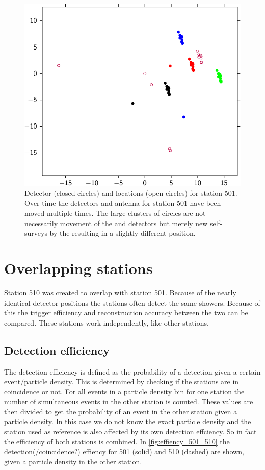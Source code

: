 \begin{figure}
    \centering
    \includegraphics{plots/station/locations_501}
    \caption{Detector (closed circles) and \gps locations (open circles) for station 501. Over time the detectors and \gps antenna for station 501 have been moved multiple times. The large clusters of circles are not necessarily movement of the \gps and detectors but merely new self-surveys by the \gps resulting in a slightly different position.}
    \label{fig:locations_501}
\end{figure}


\section{Overlapping stations}

Station 510 was created to overlap with station 501. Because of the nearly identical detector positions the stations often detect the same showers. Because of this the trigger efficiency and reconstruction accuracy between the two can be compared. These stations work independently, like other stations.


\subsection{Detection efficiency}

The detection efficiency is defined as the probability of a detection given a certain event/particle density. This is determined by checking if the stations are in coincidence or not. For all events in a particle density bin for one station the number of simultaneous events in the other station is counted. These values are then divided to get the probability of an event in the other station given a particle density. In this case we do not know the exact particle density and the station used as reference is also affected by its own detection effciency. So in fact the efficiency of both stations is combined. In \cref{fig:effiency_501_510} the detection(/coincidence?) effiency for 501 (solid) and 510 (dashed) are shown, given a particle density in the other station.

